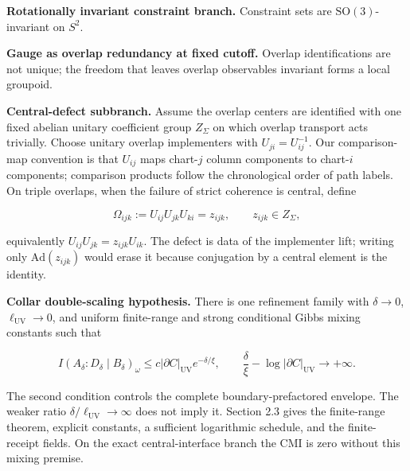 \textbf{Rotationally invariant constraint branch.} Constraint sets are \(\mathrm{SO}(3)\)-invariant on \(S^2\).

\textbf{Gauge as overlap redundancy at fixed cutoff.} Overlap identifications are not unique; the freedom that leaves overlap observables invariant forms a local groupoid.

\textbf{Central-defect subbranch.} Assume the overlap centers are identified with one fixed
abelian unitary coefficient group \(Z_\Sigma\) on which overlap transport acts trivially. Choose
unitary overlap implementers with \(U_{ji}=U_{ij}^{-1}\). Our comparison-map
convention is that \(U_{ij}\) maps chart-\(j\) column components to chart-\(i\)
components; comparison products follow the chronological order of path labels.
On triple overlaps, when the failure of strict coherence is central, define

\[
\Omega_{ijk}:=U_{ij}U_{jk}U_{ki}=z_{ijk},
\qquad z_{ijk}\in Z_\Sigma,
\]

equivalently \(U_{ij}U_{jk}=z_{ijk}U_{ik}\). The defect is data of the implementer lift; writing only
\(\mathrm{Ad}(z_{ijk})\) would erase it because conjugation by a central element is the identity.

\textbf{Collar double-scaling hypothesis.} There is one refinement family with
\(\delta\to0\), \(\ell_{\mathrm{UV}}\to0\), and uniform finite-range and strong
conditional Gibbs mixing constants such that

\[
I(A_\delta:D_\delta \mid B_\delta)_\omega
\le c|\partial C|_{\mathrm{UV}}e^{-\delta/\xi},
\qquad
\frac{\delta}{\xi}-\log|\partial C|_{\mathrm{UV}}\longrightarrow+\infty.
\]

The second condition controls the complete boundary-prefactored envelope. The weaker ratio
\(\delta/\ell_{\mathrm{UV}}\to\infty\) does not imply it. Section 2.3 gives the
finite-range theorem, explicit constants, a sufficient logarithmic schedule, and the finite-receipt
fields. On the exact central-interface branch the CMI is zero without this mixing premise.

